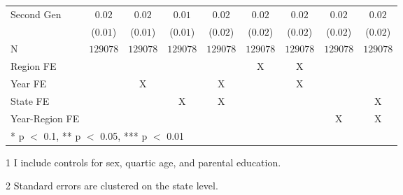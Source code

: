 \begin{table}[!h]
{\begin{threeparttable}
\begin{tabular}[t]{lcccccccc}
Second Gen & $0.02$ & $0.02$ & $0.01$ & $0.02$ & $0.02$ & $0.02$ & $0.02$ & $0.02$\\
 & ($0.01$) & ($0.01$) & ($0.01$) & ($0.02$) & ($0.02$) & ($0.02$) & ($0.02$) & ($0.02$)\\
\midrule
N & $129078$ & $129078$ & $129078$ & $129078$ & $129078$ & $129078$ & $129078$ & $129078$\\
Region FE &  &  &  &  & X & X &  & \\
Year FE &  & X &  & X &  & X &  & \\
State FE &  &  & X & X &  &  &  & X\\
Year-Region FE &  &  &  &  &  &  & X & X\\
\bottomrule
\multicolumn{9}{l}{\rule{0pt}{1em}* p $<$ 0.1, ** p $<$ 0.05, *** p $<$ 0.01}\\
\end{tabular}
\begin{tablenotes}
\small
\item[1] \footnotesize{I include controls for sex, quartic age, and parental education.}
\item[2] \footnotesize{Standard errors are clustered on the state level.}
\end{tablenotes}
\end{threeparttable}}
\end{table}
